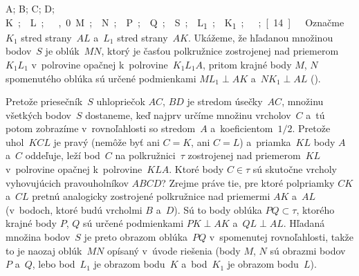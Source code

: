{%
\fontplace
\trpoint A; \tlpoint B; \blpoint C; \brpoint D;
\lBpoint{}\unit K; \bpoint L;
\tpoint{},0 M; \rpoint N;
\blpoint P; \lBpoint Q; \bpoint S;
\tpoint L_1; \rBpoint K_1;
\bpoint\tau;
[14] \hfil\Obr

Označme $K_1$ stred strany~$AL$ a~$L_1$ stred strany~$AK$.
Ukážeme, že hľadanou množinou bodov~$S$ je oblúk~$MN$, ktorý je
časťou polkružnice zostrojenej nad priemerom~$K_1L_1$ v~polrovine
opačnej k~polrovine~$K_1L_1A$, pritom krajné body $M$, $N$
spomenutého oblúka sú určené podmienkami $ML_1\perp AK$
a~$NK_1\perp AL$ (\obr).

\inspicture

Pretože priesečník~$S$ uhlopriečok $AC$, $BD$ je stredom úsečky~$AC$,
množinu všetkých bodov~$S$ dostaneme, keď najprv určíme
množinu vrcholov~$C$ a~tú potom zobrazíme v~rovnoľahlosti so
stredom~$A$ a~koeficientom~$1/2$. Pretože uhol~$KCL$ je pravý
(nemôže byť ani $C=K$, ani $C=L$) a~priamka~$KL$ body $A$ a~$C$
oddeľuje, leží bod~$C$ na polkružnici~$\tau$ zostrojenej nad
priemerom~$KL$ v~polrovine opačnej k~polrovine~$KLA$. Ktoré body
$C\in\tau$ sú skutočne vrcholy vyhovujúcich pravouholníkov
$ABCD$? Zrejme práve tie, pre ktoré polpriamky $CK$ a~$CL$ pretnú
analogicky zostrojené polkružnice nad priemermi $AK$ a~$AL$
(v~bodoch, ktoré budú vrcholmi $B$ a~$D$). Sú to body
oblúka $PQ\subset\tau$, ktorého krajné body $P$, $Q$ sú určené
podmienkami $PK\perp AK$ a~$QL\perp AL$. Hľadaná množina bodov~$S$
je preto obrazom oblúka~$PQ$ v~spomenutej rovnoľahlosti, takže to
je naozaj oblúk~$MN$ opísaný v~úvode riešenia (body $M$, $N$
sú obrazmi bodov $P$ a~$Q$, lebo bod~$L_1$ je obrazom bodu~$K$
a~bod~$K_1$ je obrazom bodu~$L$).}

